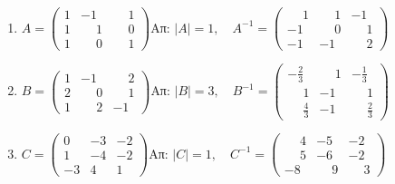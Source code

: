 \documentclass[a4paper,12pt]{article}
\begin{document}
\begin{enumerate}
\begin{enumerate}
\item 
\(
A=\begin{pmatrix}
1 & -1 & \phantom{-}1\\ 
1 & \phantom{-}1 & \phantom{-}0\\ 
1 & \phantom{-}0 & \phantom{-}1
\end{pmatrix}
\)\hfill Απ: $|A|=1,\quad A^{-1}=\begin{pmatrix}
\phantom{-}1 & \phantom{-}1 & -1\\ 
-1 & \phantom{-}0 & \phantom{-}1\\ 
-1 & -1 & \phantom{-}2
\end{pmatrix}$
\item 
\(
B=\begin{pmatrix}
1 & -1 & \phantom{-}2\\ 
2 & \phantom{-}0 & \phantom{-}1\\ 
1 & \phantom{-}2 & -1
\end{pmatrix}
\)\hfill Απ: $|B|=3,\quad B^{-1}=\begin{pmatrix}
-\frac{2}{3} & \phantom{-}1 & -\frac{1}{3}\\ 
\phantom{-}1 & -1 & \phantom{-}1\\ 
\phantom{-}\frac{4}{3} & -1 & \phantom{-}\frac{2}{3}
\end{pmatrix} $
\item 
\(
C=\begin{pmatrix}
0 & -3 & -2\\ 
1 & -4 & -2\\ 
-3 & 4 & 1
\end{pmatrix}
\)\hfill Απ: $|C|=1,\quad C^{-1}= \begin{pmatrix}
\phantom{-}4 & -5 & -2\\ 
\phantom{-}5 & -6 & -2\\ 
-8 & \phantom{-}9 & \phantom{-}3
\end{pmatrix}$


\end{enumerate}

\end{enumerate}
\end{document}
